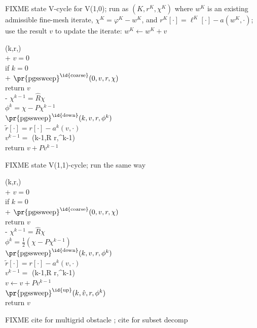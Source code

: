 \documentclass[letterpaper,final,12pt,reqno]{amsart}
\numberwithin{equation}{section}
\numberwithin{figure}{section}
\numberwithin{table}{section}
\begin{document}
FIXME state V-cycle for V(1,0); run as $(K,r^K,\chi^K)$ where $w^K$ is an existing admissible fine-mesh iterate, $\chi^K=\varphi^K-w^K$, and $r^K[\cdot] = \ell^K[\cdot] - a(w^K,\cdot)$; use the result $v$ to update the iterate: $w^K \gets w^K + v$
\begin{pseudo*}
(k,r,\chi)\text{:} \\+
    $v=0$ \\
    if $k=0$ \\+
        $\text{\pr{pgssweep}}^{\text{\id{coarse}}}(0,v,r,\chi)$ \\
        return $v$ \\-
    $\chi^{k-1} = \hat R \chi$ \\
    $\phi^k = \chi - P\chi^{k-1}$ \\
    $\text{\pr{pgssweep}}^{\text{\id{down}}}(k,v,r,\phi^k)$ \\
    $\tilde r[\cdot] = r[\cdot] - a^k(v,\cdot)$ \\
    $v^{k-1} =$ (k-1,R \tilde r,\chi^{k-1}) \\
    return $v + P v^{k-1}$
\end{pseudo*}


FIXME state V(1,1)-cycle; run the same way
\begin{pseudo*}
(k,r,\chi)\text{:} \\+
    $v=0$ \\
    if $k=0$ \\+
        $\text{\pr{pgssweep}}^{\text{\id{coarse}}}(0,v,r,\chi)$ \\
        return $v$ \\-
    $\chi^{k-1} = \hat R \chi$ \\
    $\phi^k = \frac{1}{2} (\chi - P\chi^{k-1})$ \\
    $\text{\pr{pgssweep}}^{\text{\id{down}}}(k,v,r,\phi^k)$ \\
    $\tilde r[\cdot] = r[\cdot] - a^k(v,\cdot)$ \\
    $v^{k-1} =$ (k-1,R \tilde r,\chi^{k-1}) \\
    $v \gets v + P v^{k-1}$ \\
    $\text{\pr{pgssweep}}^{\text{\id{up}}}(k,\hat v,r,\phi^k)$ \\
    return $v$
\end{pseudo*}

FIXME cite for multigrid obstacle \cite{BrandtCryer1983,Bueler2021,GraeserKornhuber2009,Jouvetetal2013}; cite for subset decomp \cite{Tai2003}
\end{document}
